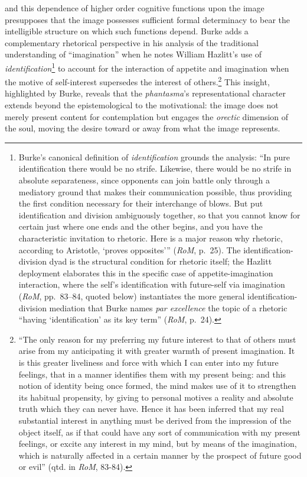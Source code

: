 \documentclass{article}
\begin{document}
and this dependence of higher order cognitive functions upon the image presupposes that the image possesses sufficient formal determinacy to bear the intelligible structure on which such functions depend. Burke adds a complementary rhetorical perspective in his analysis of the traditional understanding of ``imagination'' when he notes William Hazlitt's use of \textit{identification}\footnote{Burke's canonical definition of \textit{identification} grounds the analysis: ``In pure identification there would be no strife. Likewise, there would be no strife in absolute separateness, since opponents can join battle only through a mediatory ground that makes their communication possible, thus providing the first condition necessary for their interchange of blows. But put identification and division ambiguously together, so that you cannot know for certain just where one ends and the other begins, and you have the characteristic invitation to rhetoric. Here is a major reason why rhetoric, according to Aristotle, `proves opposites''' (\textit{RoM}, p.~25). The identification-division dyad is the structural condition for rhetoric itself; the Hazlitt deployment elaborates this in the specific case of appetite-imagination interaction, where the self's identification with future-self via imagination (\textit{RoM}, pp.~83--84, quoted below) instantiates the more general identification-division mediation that Burke names \textit{par excellence} the topic of a rhetoric ``having `identification' as its key term'' (\textit{RoM}, p.~24).} to account for the interaction of appetite and imagination when the motive of self-interest supersedes the interest of others.\footnote{``The only reason for my preferring my future interest to that of others must arise from my anticipating it with greater warmth of present imagination. It is this greater liveliness and force with which I can enter into my future feelings, that in a manner identifies them with my present being: and this notion of identity being once formed, the mind makes use of it to strengthen its habitual propensity, by giving to personal motives a reality and absolute truth which they can never have. Hence it has been inferred that my real substantial interest in anything must be derived from the impression of the object itself, as if that could have any sort of communication with my present feelings, or excite any interest in my mind, but by means of the imagination, which is naturally affected in a certain manner by the prospect of future good or evil'' (qtd. in \textit{RoM}, 83-84).} This insight, highlighted by Burke, reveals that the \textit{phantasma}'s representational character extends beyond the epistemological to the motivational: the image does not merely present content for contemplation but engages the \textit{orectic} dimension of the soul, moving the desire toward or away from what the image represents. 
\end{document}
